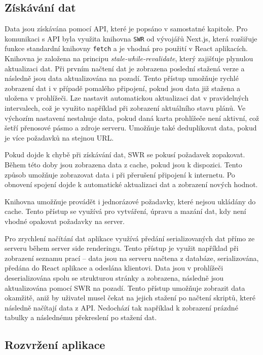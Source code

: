 \subsection{Získávání dat}

Data jsou získávána pomocí API, které je popsáno v samostatné kapitole. Pro komunikaci s API byla využita knihovna \texttt{SWR} od vývojářů Next.js, která
rozšiřuje funkce standardní knihovny \texttt{fetch} a je vhodná pro použití v React aplikacích. Knihovna je založena na principu \textit{stale-while-revalidate},
který zajišťuje plynulou aktualizaci dat. Při prvním načtení dat je zobrazena poslední stažená verze a následně jsou data aktualizována na pozadí. Tento přístup
umožňuje rychlé zobrazení dat i v případě pomalého připojení, pokud jsou data již stažena a uložena v prohlížeči. Lze nastavit automatickou aktualizaci dat 
v pravidelných intervalech, což je využito například při zobrazení aktuálního stavu plánů. Ve výchozím nastavení nestahuje data, pokud daná karta prohlížeče není
aktivní, což šetří přenosové pásmo a zdroje serveru. Umožňuje také deduplikovat data, pokud je více požadavků na stejnou URL.

Pokud dojde k chybě při získávání dat, SWR se pokusí požadavek zopakovat. Během této doby jsou zobrazena data z cache, pokud jsou k dispozici. Tento způsob
umožňuje zobrazovat data i při přerušení připojení k internetu. Po obnovení spojení dojde k automatické aktualizaci dat a zobrazení nových hodnot.

Knihovna umožňuje provádět i jednorázové požadavky, které nejsou ukládány do cache. Tento přístup se využívá pro vytváření, úpravu a mazání dat, kdy není vhodné
opakovat požadavky na server.

Pro zrychlení načítání dat aplikace využívá předání serializovaných dat přímo ze serveru během server side renderingu. Tento přístup je využit například při
zobrazení seznamu prací -- data jsou na serveru načtena z databáze, serializována, předána do React aplikace a odeslána klientovi.
Data jsou v prohlížeči deserializována spolu se strukturou stránky a zobrazena, následně jsou aktualizována pomocí SWR na pozadí. Tento přístup umožňuje zobrazit data okamžitě, aniž by
uživatel musel čekat na jejich stažení po načtení skriptů, které následně načítají data z API.
Nedochází tak například k zobrazení prázdné tabulky a následnému překreslení po stažení dat.

\subsection{Rozvržení aplikace}

